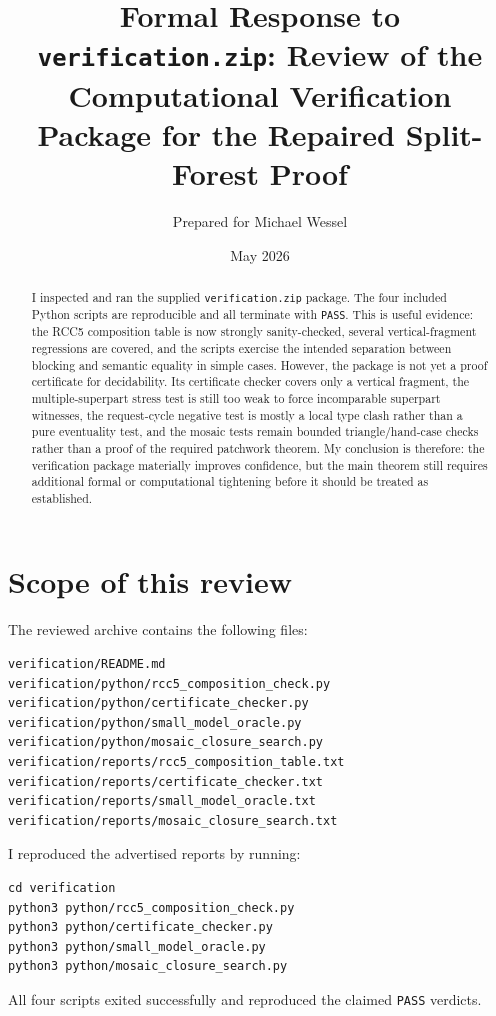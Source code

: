 \documentclass[11pt]{article}
\title{Formal Response to \texttt{verification.zip}: Review of the Computational Verification Package for the Repaired Split-Forest Proof}
\author{Prepared for Michael Wessel}
\date{May 2026}
\begin{document}
\maketitle

\begin{abstract}
I inspected and ran the supplied \texttt{verification.zip} package.  The four included Python scripts are reproducible and all terminate with \texttt{PASS}.  This is useful evidence: the RCC5 composition table is now strongly sanity-checked, several vertical-fragment regressions are covered, and the scripts exercise the intended separation between blocking and semantic equality in simple cases.  However, the package is not yet a proof certificate for decidability.  Its certificate checker covers only a vertical fragment, the multiple-superpart stress test is still too weak to force incomparable superpart witnesses, the request-cycle negative test is mostly a local type clash rather than a pure eventuality test, and the mosaic tests remain bounded triangle/hand-case checks rather than a proof of the required patchwork theorem.  My conclusion is therefore: the verification package materially improves confidence, but the main theorem still requires additional formal or computational tightening before it should be treated as established.
\end{abstract}

\section{Scope of this review}

The reviewed archive contains the following files:
\begin{lstlisting}
verification/README.md
verification/python/rcc5_composition_check.py
verification/python/certificate_checker.py
verification/python/small_model_oracle.py
verification/python/mosaic_closure_search.py
verification/reports/rcc5_composition_table.txt
verification/reports/certificate_checker.txt
verification/reports/small_model_oracle.txt
verification/reports/mosaic_closure_search.txt
\end{lstlisting}

I reproduced the advertised reports by running:
\begin{lstlisting}
cd verification
python3 python/rcc5_composition_check.py
python3 python/certificate_checker.py
python3 python/small_model_oracle.py
python3 python/mosaic_closure_search.py
\end{lstlisting}
All four scripts exited successfully and reproduced the claimed \texttt{PASS} verdicts.
\end{document}
